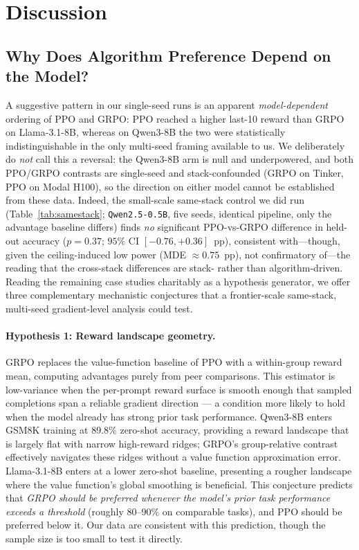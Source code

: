 \documentclass{article}
\begin{document}
\section{Discussion}
\label{sec:discussion}

\subsection{Why Does Algorithm Preference Depend on the Model?}
\label{sec:discuss_model_algo}

A suggestive pattern in our single-seed runs is an apparent \emph{model-dependent}
ordering of PPO and GRPO: PPO reached a higher last-10 reward than GRPO on
Llama-3.1-8B, whereas on Qwen3-8B the two were statistically indistinguishable in
the only multi-seed framing available to us. We deliberately do \emph{not} call
this a reversal: the Qwen3-8B arm is null and underpowered, and both PPO/GRPO
contrasts are single-seed and stack-confounded (GRPO on Tinker, PPO on Modal
H100), so the direction on either model cannot be established from these data.
Indeed, the small-scale same-stack control we did run (Table~\ref{tab:samestack};
\texttt{Qwen2.5-0.5B}, five seeds, identical pipeline, only the advantage
baseline differs) finds \emph{no} significant PPO-vs-GRPO difference in held-out
accuracy ($p{=}0.37$; $95\%$ CI $[-0.76,+0.36]$~pp), consistent with---though,
given the ceiling-induced low power (MDE $\approx 0.75$~pp), not confirmatory
of---the reading that the cross-stack differences are stack- rather than
algorithm-driven. Reading the remaining
case studies charitably as a hypothesis generator, we offer three complementary
mechanistic conjectures that a frontier-scale same-stack, multi-seed
gradient-level analysis could test.

\paragraph{Hypothesis 1: Reward landscape geometry.}
GRPO replaces the value-function baseline of PPO with a within-group reward
mean, computing advantages purely from peer comparisons.
This estimator is low-variance when the per-prompt reward surface is smooth
enough that sampled completions span a reliable gradient direction --- a
condition more likely to hold when the model already has strong prior task
performance.
Qwen3-8B enters GSM8K training at 89.8\% zero-shot accuracy, providing a
reward landscape that is largely flat with narrow high-reward ridges; GRPO's
group-relative contrast effectively navigates these ridges without a value
function approximation error.
Llama-3.1-8B enters at a lower zero-shot baseline, presenting a rougher
landscape where the value function's global smoothing is beneficial.
This conjecture predicts that \emph{GRPO should be preferred whenever the
model's prior task performance exceeds a threshold} (roughly 80--90\% on
comparable tasks), and PPO should be preferred below it.
Our data are consistent with this prediction, though the sample size is too
small to test it directly.
\end{document}
